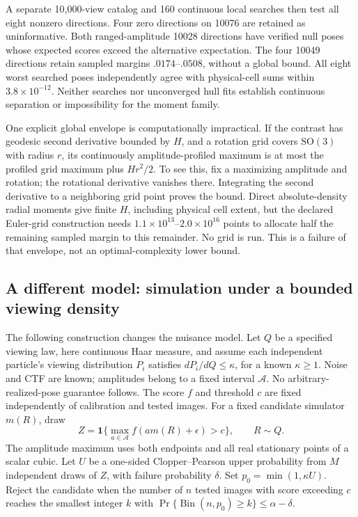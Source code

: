 A separate 10,000-view catalog and 160 continuous local searches then test all
eight nonzero directions. Four zero directions on 10076 are retained as
uninformative. Both ranged-amplitude 10028 directions have verified null poses
whose expected scores exceed the alternative expectation. The four 10049
directions retain sampled margins $.0174$--$.0508$, without a global bound.
All eight worst searched poses independently agree with physical-cell sums
within $3.8\times10^{-12}$. Neither searches nor unconverged hull fits establish
continuous separation or impossibility for the moment family.

One explicit global envelope is computationally impractical. If the contrast
has geodesic second derivative bounded by $H$, and a rotation grid covers
$\mathrm{SO}(3)$ with radius $r$, its continuously amplitude-profiled maximum
is at most the profiled grid maximum plus $Hr^2/2$. To see this, fix a
maximizing amplitude and rotation; the rotational derivative vanishes there.
Integrating the second derivative to a neighboring grid point proves the
bound. Direct absolute-density radial moments give finite $H$, including
physical cell extent, but the declared Euler-grid construction needs
$1.1\times10^{13}$--$2.0\times10^{16}$ points to allocate half the remaining
sampled margin to this remainder. No grid is run. This is a failure of that
envelope, not an optimal-complexity lower bound.

\subsection{A different model: simulation under a bounded viewing density}
The following construction changes the nuisance model. Let $Q$ be a specified
viewing law, here continuous Haar measure, and assume each independent
particle's viewing distribution $P_i$ satisfies $dP_i/dQ\le\kappa$, for a
known $\kappa\ge1$. Noise and CTF are known; amplitudes belong to a fixed
interval $\mathcal A$. No arbitrary-realized-pose guarantee follows.
The score $f$ and threshold $c$ are fixed independently of calibration and
tested images. For a fixed candidate simulator $m(R)$, draw
\[
Z=\mathbf1\{\max_{a\in\mathcal A} f(a m(R)+\epsilon)>c\},
\qquad R\sim Q.
\]
The amplitude maximum uses both endpoints and all real stationary points
of a scalar cubic. Let $U$ be a one-sided Clopper--Pearson upper probability
from $M$ independent draws of $Z$, with failure probability $\delta$.
Set $p_0=\min(1,\kappa U)$. Reject the candidate when the number of $n$ tested
images with score exceeding $c$ reaches the smallest integer $k$ with
$\Pr\{\operatorname{Bin}(n,p_0)\ge k\}\le\alpha-\delta$.

